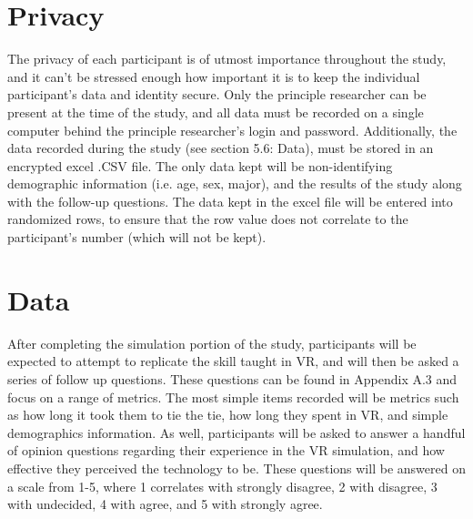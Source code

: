 \section{Privacy}
\label{sec:Privacy}

The privacy of each participant is of utmost importance throughout the study, and it can't be stressed enough how important it is to keep the individual participant's data and identity secure. Only the principle researcher can be present at the time of the study, and all data must be recorded on a single computer behind the principle researcher's login and password. Additionally, the data recorded during the study (see section 5.6: Data), must be stored in an encrypted excel .CSV file. The only data kept will be non-identifying demographic information (i.e. age, sex, major), and the results of the study along with the follow-up questions. The data kept in the excel file will be entered into randomized rows, to ensure that the row value does not correlate to the participant's number (which will not be kept). 

\section{Data}
\label{sec:data}

After completing the simulation portion of the study, participants will be expected to attempt to replicate the skill taught in VR, and will then be asked a series of follow up questions. These questions can be found in Appendix A.3 and focus on a range of metrics. The most simple items recorded will be metrics such as how long it took them to tie the tie, how long they spent in VR, and simple demographics information. As well, participants will be asked to answer a handful of opinion questions regarding their experience in the VR simulation, and how effective they perceived the technology to be. These questions will be answered on a scale from 1-5, where 1 correlates with strongly disagree, 2 with disagree, 3 with undecided, 4 with agree, and 5 with strongly agree.